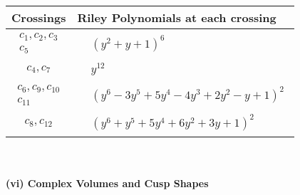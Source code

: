 \documentclass[1p]{elsarticle_modified}
\theoremstyle{definition}
\begin{document}
\begin{tabular}{m{50pt}|m{274pt}}
Crossings & \hspace{64pt}Riley Polynomials at each crossing \\
\hline $$\begin{aligned}c_{1},c_{2},c_{3}\\c_{5}\end{aligned}$$&$\begin{aligned}
&(y^2+y+1)^6
\end{aligned}$\\
\hline $$\begin{aligned}c_{4},c_{7}\end{aligned}$$&$\begin{aligned}
&y^{12}
\end{aligned}$\\
\hline $$\begin{aligned}c_{6},c_{9},c_{10}\\c_{11}\end{aligned}$$&$\begin{aligned}
&(y^6-3 y^5+5 y^4-4 y^3+2 y^2- y+1)^2
\end{aligned}$\\
\hline $$\begin{aligned}c_{8},c_{12}\end{aligned}$$&$\begin{aligned}
&(y^6+y^5+5 y^4+6 y^2+3 y+1)^2
\end{aligned}$\\
\hline
\end{tabular}\\~\\
\newpage\flushleft \textbf{(vi) Complex Volumes and Cusp Shapes}
\end{document}
